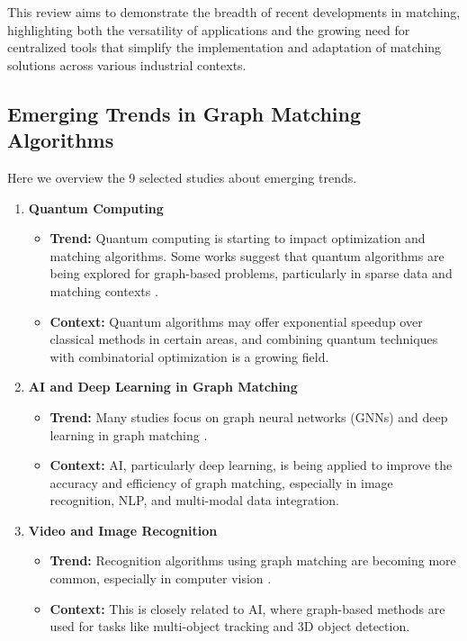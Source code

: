     

    
    
    This review aims to demonstrate the breadth of recent developments in matching, highlighting both the versatility of applications and the growing need for centralized tools that simplify the implementation and adaptation of matching solutions across various industrial contexts.

    \subsection{Emerging Trends in Graph Matching Algorithms}
        Here we overview the 9 selected studies about emerging trends.
        \begin{enumerate}
            \item \textbf{Quantum Computing}
            \begin{itemize}
                \item \textbf{Trend:} Quantum computing is starting to impact optimization and matching algorithms. Some works suggest that quantum algorithms are being explored for graph-based problems, particularly in sparse data and matching contexts \cite{quantum_matching}.
                \item \textbf{Context:} Quantum algorithms may offer exponential speedup over classical methods in certain areas, and combining quantum techniques with combinatorial optimization is a growing field.
            \end{itemize}
            
            \item \textbf{AI and Deep Learning in Graph Matching}
            \begin{itemize}
                \item \textbf{Trend:} Many studies focus on graph neural networks (GNNs) and deep learning in graph matching \cite{gnn_graph_matching, cross_modal_matching}.
                \item \textbf{Context:} AI, particularly deep learning, is being applied to improve the accuracy and efficiency of graph matching, especially in image recognition, NLP, and multi-modal data integration.
            \end{itemize}
        
            \item \textbf{Video and Image Recognition}
            \begin{itemize}
                \item \textbf{Trend:} Recognition algorithms using graph matching are becoming more common, especially in computer vision \cite{image_keypoint_matching}.
                \item \textbf{Context:} This is closely related to AI, where graph-based methods are used for tasks like multi-object tracking and 3D object detection.
            \end{itemize}
        

\end{enumerate}

